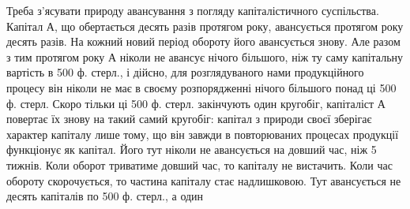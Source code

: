 Треба з’ясувати природу авансування з погляду капіталістичного суспільства.
Капітал $А$, що обертається десять разів протягом року, авансується
протягом року десять разів. На кожний новий період обороту його авансується
знову. Але разом з тим протягом року $А$ ніколи не авансує нічого
більшого, ніж ту саму капітальну вартість в 500 ф. стерл., і дійсно,
для розглядуваного нами продукційного процесу він ніколи не має в
своєму розпорядженні нічого більшого понад ці 500 ф. стерл. Скоро тільки
ці 500 ф. стерл. закінчують один кругобіг, капіталіст $А$ повертає їх
знову на такий самий кругобіг: капітал з природи своєї зберігає характер
капіталу лише тому, що він завжди в повторюваних процесах продукції
функціонує як капітал. Його тут ніколи не авансується на довший час,
ніж 5 тижнів. Коли оборот триватиме довший час, то капіталу не вистачить.
Коли час обороту скорочується, то частина капіталу стає надлишковою.
Тут авансується не десять капіталів по 500 ф. стерл., а один
\parbreak{}  %
